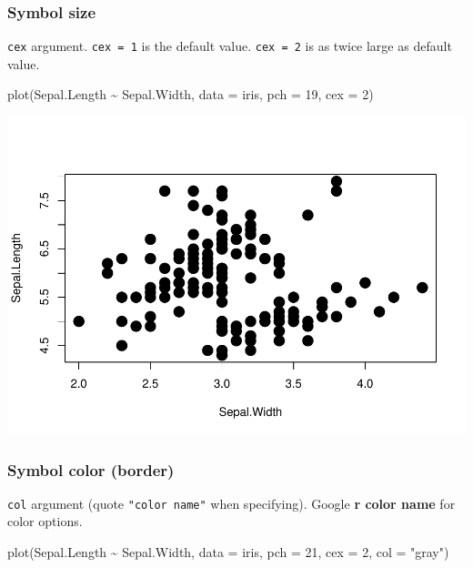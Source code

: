 \documentclass[
]{article}
\newenvironment{Shaded}{\begin{snugshade}}{\end{snugshade}}
\newcommand{\AttributeTok}[1]{\textcolor[rgb]{0.77,0.63,0.00}{#1}}
\newcommand{\DecValTok}[1]{\textcolor[rgb]{0.00,0.00,0.81}{#1}}
\newcommand{\FunctionTok}[1]{\textcolor[rgb]{0.00,0.00,0.00}{#1}}
\newcommand{\NormalTok}[1]{#1}
\newcommand{\SpecialCharTok}[1]{\textcolor[rgb]{0.00,0.00,0.00}{#1}}
\newcommand{\StringTok}[1]{\textcolor[rgb]{0.31,0.60,0.02}{#1}}
\begin{document}
\hypertarget{symbol-size}{%
\subsubsection{Symbol size}\label{symbol-size}}

\texttt{cex} argument. \texttt{cex\ =\ 1} is the default value. \texttt{cex\ =\ 2} is as twice large as default value.

\begin{Shaded}
\begin{Highlighting}[]
\FunctionTok{plot}\NormalTok{(Sepal.Length }\SpecialCharTok{\textasciitilde{}}\NormalTok{ Sepal.Width, }\AttributeTok{data =}\NormalTok{ iris,}
     \AttributeTok{pch =} \DecValTok{19}\NormalTok{, }\AttributeTok{cex =} \DecValTok{2}\NormalTok{)}
\end{Highlighting}
\end{Shaded}

\begin{center}\includegraphics{biostats_files/figure-latex/unnamed-chunk-125-1} \end{center}

\hypertarget{symbol-color-border}{%
\subsubsection{Symbol color (border)}\label{symbol-color-border}}

\texttt{col} argument (quote \texttt{"color\ name"} when specifying). Google \textbf{r color name} for color options.

\begin{Shaded}
\begin{Highlighting}[]
\FunctionTok{plot}\NormalTok{(Sepal.Length }\SpecialCharTok{\textasciitilde{}}\NormalTok{ Sepal.Width, }\AttributeTok{data =}\NormalTok{ iris,}
     \AttributeTok{pch =} \DecValTok{21}\NormalTok{, }\AttributeTok{cex =} \DecValTok{2}\NormalTok{, }\AttributeTok{col =} \StringTok{"gray"}\NormalTok{)}
\end{Highlighting}
\end{Shaded}
\end{document}
